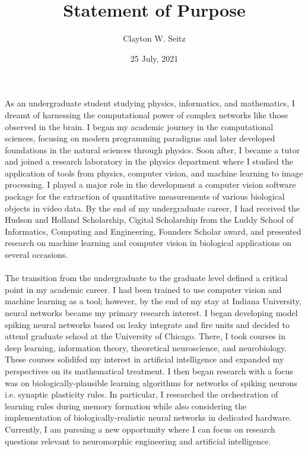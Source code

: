 \documentclass{article}
\title{Statement of Purpose}
\author{Clayton W. Seitz}
\date{25 July, 2021}
\begin{document}
  \maketitle%
\vspace{0.4in}

\indent As an undergraduate student studying physics, informatics, and mathematics, I dreamt of harnessing the computational power of complex networks like those observed in the brain. I began my academic journey in the computational sciences, focusing on modern programming paradigms and later developed foundations in the natural sciences through physics. Soon after, I became a tutor and joined a research laboratory in the physics department where I studied the application of tools from physics, computer vision, and machine learning to image processing. I played a major role in the development a computer vision software package for the extraction of quantitative measurements of various biological objects in video data. By the end of my undergraduate career, I had received the Hudson and Holland Scholarship, Cigital Scholarship from the Luddy School of Informatics, Computing and Engineering, Founders Scholar award, and presented research on machine learning and computer vision in biological applications on several occasions.\\
\\
\indent  The transition from the undergraduate to the graduate level defined a critical point in my academic career. I had been trained to use computer vision and machine learning as a tool; however, by the end of my stay at Indiana University, neural networks became my primary research interest. I began developing model spiking neural networks based on leaky integrate and fire units and decided to attend graduate school at the University of Chicago. There, I took courses in deep learning, information theory, theoretical neuroscience, and neurobiology. These courses solidifed my interest in artificial intelligence and expanded my perspectives on its mathematical treatment. I then began research with a focus was on biologically-plausible learning algorithms for networks of spiking neurons i.e. synaptic plasticity rules. In particular, I researched the orchestration of learning rules during memory formation while also considering the implementation of biologically-realistic neural networks in dedicated hardware. Currently, I am pursuing a new opportunity where I can focus on research questions relevant to neuromorphic engineering and artificial intelligence.\\
\end{document}
